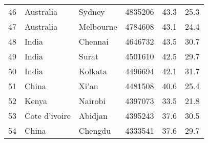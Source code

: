 \begin{center}
\begin{longtable}{clllcc}
        46                                       & Australia                            & Sydney                            & 4835206                                 & 43.3                                  & 25.3                                  \\
        47                                       & Australia                            & Melbourne                         & 4784608                                 & 43.1                                  & 24.4                                  \\
        48                                       & India                                & Chennai                           & 4646732                                 & 43.5                                  & 30.7                                  \\
        49                                       & India                                & Surat                             & 4501610                                 & 42.5                                  & 29.7                                  \\
        50                                       & India                                & Kolkata                           & 4496694                                 & 42.1                                  & 31.7                                  \\
        51                                       & China                                & Xi'an                             & 4481508                                 & 40.6                                  & 25.4                                  \\
        52                                       & Kenya                                & Nairobi                           & 4397073                                 & 33.5                                  & 21.8                                  \\
        53                                       & Cote d'ivoire                        & Abidjan                           & 4395243                                 & 37.6                                  & 30.5                                  \\
        54                                       & China                                & Chengdu                           & 4333541                                 & 37.6                                  & 29.7                                  \\

\end{longtable}
\end{center}
